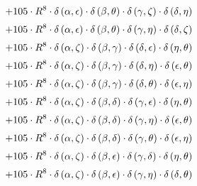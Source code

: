 \begin{subequations}
\begin{gather}
 \\[0.2em] \notag 		 + 105 \cdot R^{8} \cdot \delta{}\left(\alpha{}, \epsilon{}\right) \cdot \delta{}\left(\beta{}, \theta{}\right) \cdot \delta{}\left(\gamma{}, \zeta{}\right) \cdot \delta{}\left(\delta{}, \eta{}\right) 
 \\[0.2em] \notag 		 + 105 \cdot R^{8} \cdot \delta{}\left(\alpha{}, \epsilon{}\right) \cdot \delta{}\left(\beta{}, \theta{}\right) \cdot \delta{}\left(\gamma{}, \eta{}\right) \cdot \delta{}\left(\delta{}, \zeta{}\right) 
 \\[0.2em] \notag 		 + 105 \cdot R^{8} \cdot \delta{}\left(\alpha{}, \zeta{}\right) \cdot \delta{}\left(\beta{}, \gamma{}\right) \cdot \delta{}\left(\delta{}, \epsilon{}\right) \cdot \delta{}\left(\eta{}, \theta{}\right) 
 \\[0.2em] \notag 		 + 105 \cdot R^{8} \cdot \delta{}\left(\alpha{}, \zeta{}\right) \cdot \delta{}\left(\beta{}, \gamma{}\right) \cdot \delta{}\left(\delta{}, \eta{}\right) \cdot \delta{}\left(\epsilon{}, \theta{}\right) 
 \\[0.2em] \notag 		 + 105 \cdot R^{8} \cdot \delta{}\left(\alpha{}, \zeta{}\right) \cdot \delta{}\left(\beta{}, \gamma{}\right) \cdot \delta{}\left(\delta{}, \theta{}\right) \cdot \delta{}\left(\epsilon{}, \eta{}\right) 
 \\[0.2em] \notag 		 + 105 \cdot R^{8} \cdot \delta{}\left(\alpha{}, \zeta{}\right) \cdot \delta{}\left(\beta{}, \delta{}\right) \cdot \delta{}\left(\gamma{}, \epsilon{}\right) \cdot \delta{}\left(\eta{}, \theta{}\right) 
 \\[0.2em] \notag 		 + 105 \cdot R^{8} \cdot \delta{}\left(\alpha{}, \zeta{}\right) \cdot \delta{}\left(\beta{}, \delta{}\right) \cdot \delta{}\left(\gamma{}, \eta{}\right) \cdot \delta{}\left(\epsilon{}, \theta{}\right) 
 \\[0.2em] \notag 		 + 105 \cdot R^{8} \cdot \delta{}\left(\alpha{}, \zeta{}\right) \cdot \delta{}\left(\beta{}, \delta{}\right) \cdot \delta{}\left(\gamma{}, \theta{}\right) \cdot \delta{}\left(\epsilon{}, \eta{}\right) 
 \\[0.2em] \notag 		 + 105 \cdot R^{8} \cdot \delta{}\left(\alpha{}, \zeta{}\right) \cdot \delta{}\left(\beta{}, \epsilon{}\right) \cdot \delta{}\left(\gamma{}, \delta{}\right) \cdot \delta{}\left(\eta{}, \theta{}\right) 
 \\[0.2em] \notag 		 + 105 \cdot R^{8} \cdot \delta{}\left(\alpha{}, \zeta{}\right) \cdot \delta{}\left(\beta{}, \epsilon{}\right) \cdot \delta{}\left(\gamma{}, \eta{}\right) \cdot \delta{}\left(\delta{}, \theta{}\right) 

\end{gather}
\end{subequations}

